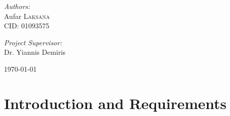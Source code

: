 \documentclass[12pt,a4paper]{report}
\begin{document}
\begin{titlepage}
\begin{flushleft}

\large \emph{Authors:} \\
Aufar \textsc{Laksana} \\
CID: 01093575\\

\addvspace{0.6em}

\large \emph{Project Supervisor:} \\
Dr. Yiannis Demiris\\

\addvspace{0.6em}


\addvspace{1.8em}

\end{flushleft}



\vspace*{3em}


{\large \today}\\[0.5cm] %


\vfill %
\end{titlepage}

\addvspace{6em}

\renewcommand{\abstractname}{\LARGE Abstract}

\tableofcontents
\newpage

\setlength{\parindent}{0pt}
\setlength{\parskip}{10pt}

\setlength{\belowcaptionskip}{-10pt}

\chapter{Introduction and Requirements}
\end{document}
